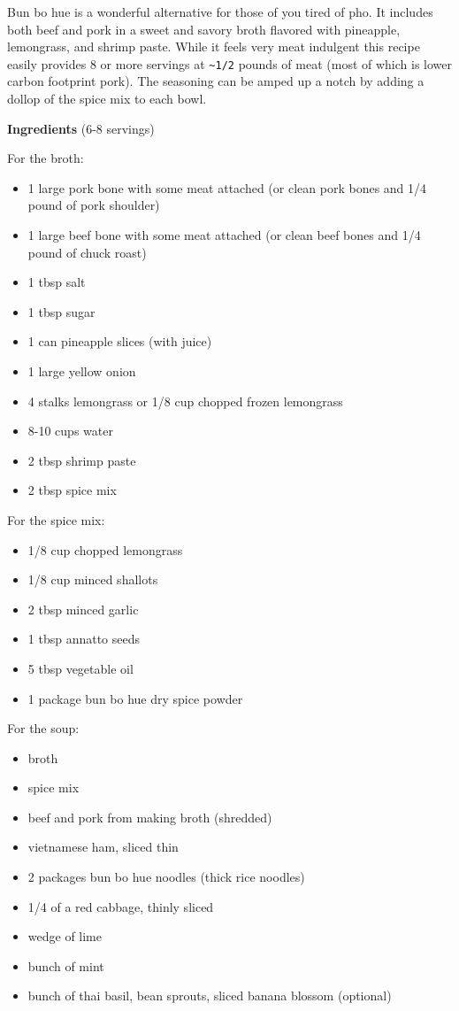 \documentclass[
]{book}
\providecommand{\tightlist}{%
  \setlength{\itemsep}{0pt}\setlength{\parskip}{0pt}}
\begin{document}
Bun bo hue is a wonderful alternative for those of you tired of pho. It includes both beef and pork in a sweet and savory broth flavored with pineapple, lemongrass, and shrimp paste. While it feels very meat indulgent this recipe easily provides 8 or more servings at \texttt{\textasciitilde{}1/2} pounds of meat (most of which is lower carbon footprint pork). The seasoning can be amped up a notch by adding a dollop of the spice mix to each bowl.

\begin{blackbox}

\textbf{Ingredients} (6-8 servings)

For the broth:

\begin{itemize}
\tightlist
\item
  1 large pork bone with some meat attached (or clean pork bones and 1/4 pound of pork shoulder)
\item
  1 large beef bone with some meat attached (or clean beef bones and 1/4 pound of chuck roast)
\item
  1 tbsp salt
\item
  1 tbsp sugar
\item
  1 can pineapple slices (with juice)
\item
  1 large yellow onion
\item
  4 stalks lemongrass or 1/8 cup chopped frozen lemongrass
\item
  8-10 cups water
\item
  2 tbsp shrimp paste
\item
  2 tbsp spice mix
\end{itemize}

For the spice mix:

\begin{itemize}
\tightlist
\item
  1/8 cup chopped lemongrass
\item
  1/8 cup minced shallots
\item
  2 tbsp minced garlic
\item
  1 tbsp annatto seeds
\item
  5 tbsp vegetable oil
\item
  1 package bun bo hue dry spice powder
\end{itemize}

For the soup:

\begin{itemize}
\tightlist
\item
  broth
\item
  spice mix
\item
  beef and pork from making broth (shredded)
\item
  vietnamese ham, sliced thin
\item
  2 packages bun bo hue noodles (thick rice noodles)
\item
  1/4 of a red cabbage, thinly sliced
\item
  wedge of lime
\item
  bunch of mint
\item
  bunch of thai basil, bean sprouts, sliced banana blossom (optional)
\end{itemize}


\end{blackbox}
\end{document}
